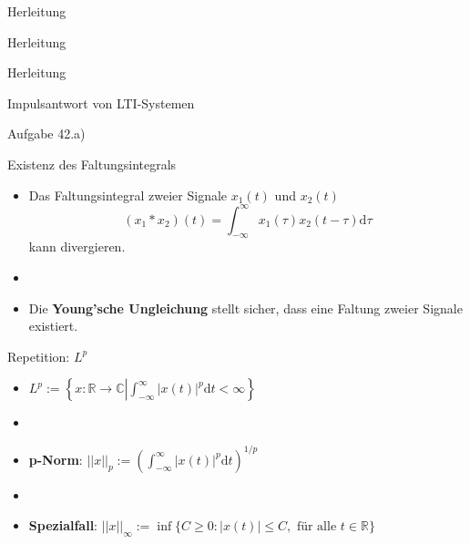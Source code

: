 \documentclass[14pt, aspectratio=169, handout]{beamer}
\begin{document}
\begin{frame}{Herleitung}
    
\end{frame}

\begin{frame}{Herleitung}
    
\end{frame}

\begin{frame}{Herleitung}
    
\end{frame}

\begin{frame}{Impulsantwort von LTI-Systemen}
\end{frame}

\begin{frame}{Aufgabe 42.a)}
    
\end{frame}

\begin{frame}{Existenz des Faltungsintegrals}
    \begin{itemize}
        \item Das Faltungsintegral zweier Signale $x_1(t)$ und $x_2(t)$ $$(x_1 \ast x_2)(t) = \int_{-\infty}^{\infty} x_1(\tau)x_2(t-\tau) \text{d}\tau$$ kann divergieren.
        \item[] 
        \item Die \textbf{Young'sche Ungleichung} stellt sicher, dass eine Faltung zweier Signale existiert.
    \end{itemize}
\end{frame}

\begin{frame}{Repetition: $L^p$}
    \begin{itemize}
        \item $L^p := \left\{ x:\mathbb{R} \to \mathbb{C} \left| \displaystyle\int_{-\infty}^{\infty} |x(t)|^p \text{d}t < \infty \right. \right\}$
        \item[] 
        \item \textbf{p-Norm}: $||x||_p := \left(\displaystyle\int_{-\infty}^{\infty} |x(t)|^p \text{d}t\right)^{1/p}$
        \item[] 
        \item \textbf{Spezialfall}: $||x||_{\infty} := \inf\{C \geq 0: |x(t)| \leq C, \text{ für alle } t\in \mathbb{R}\}$
    \end{itemize}
\end{frame}
\end{document}
